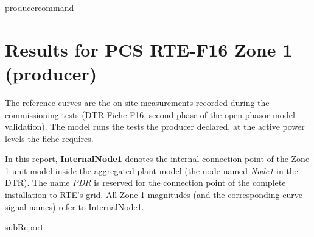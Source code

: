 {{ producercommand }}



    \section{Results for PCS RTE-F16 Zone 1 ({{producer}})}

    The reference curves are the on-site measurements recorded during the commissioning
    tests (DTR Fiche F16, second phase of the open phasor model validation). The model
    runs the tests the producer declared, at the active power levels the fiche requires.

    In this report, \textbf{InternalNode1} denotes the internal connection point of the
    Zone 1 unit model inside the aggregated plant model (the node named \emph{Node1} in
    the DTR). The name \emph{PDR} is reserved for the connection point of the complete
    installation to RTE's grid. All Zone 1 magnitudes (and the corresponding curve signal
    names) refer to InternalNode1.

    {{subReport}}
    \newpage

